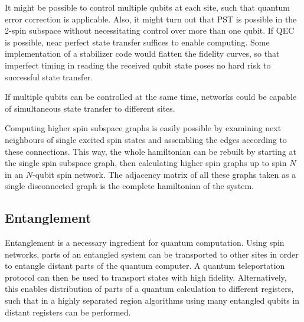 \noindent It might be possible to control multiple qubits at each site, such that quantum error correction is applicable\cite{Devitt2013}. Also, it might turn out that PST is possible in the 2-spin subspace without necessitating control over more than one qubit. If QEC is possible, near perfect state transfer suffices to enable computing\cite{Andrist2016}. Some implementation of a stabilizer code would flatten the fidelity curves, so that imperfect timing in reading the received qubit state poses no hard risk to successful state transfer.\par
If multiple qubits can be controlled at the same time, networks could be capable of simultaneous state transfer to different sites.\par
Computing higher spin subspace graphs is easily possible by examining next neighbours of single excited spin states and assembling the edges according to these connections. This way, the whole hamiltonian can be rebuilt by starting at the single spin subspace graph, then calculating higher spin graphs up to spin $N$ in an $N$-qubit spin network. The adjacency matrix of all these graphs taken as a single disconnected graph is the complete hamiltonian of the system.

\subsection{Entanglement}

\begin{center}
\end{center}

\noindent Entanglement is a necessary ingredient for quantum computation. Using spin networks, parts of an entangled system can be transported to other sites in order to entangle distant parts of the quantum computer\cite{Plastina2007}. A quantum teleportation protocol can then be used to transport states with high fidelity. Alternatively, this enables distribution of parts of a quantum calculation to different registers, such that in a highly separated region algorithms using many entangled qubits in distant registers can be performed.

